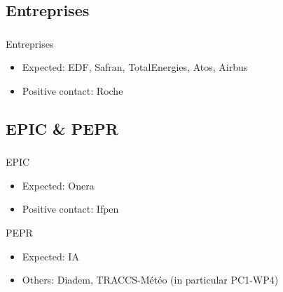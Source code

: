 \subsection{Entreprises}
\begin{frame}
  \frametitle{\insertsectionhead}
  \framesubtitle{\insertsubsectionhead}
  \begin{alertblock}{Entreprises}
    \begin{itemize}
      \item Expected: EDF, Safran, TotalEnergies, Atos, Airbus
      \item Positive contact: Roche
    \end{itemize}
  \end{alertblock}
\end{frame}

\subsection{EPIC \& PEPR}
\begin{frame}
  \frametitle{\insertsectionhead}
  \framesubtitle{\insertsubsectionhead}
\begin{alertblock}{EPIC}
  \begin{itemize}
    \item Expected: Onera
    \item Positive contact: Ifpen
  \end{itemize}
\end{alertblock}

\begin{alertblock}{PEPR}
  \begin{itemize}
    \item Expected: IA
    \item Others: Diadem, TRACCS-Météo (in particular PC1-WP4)
  \end{itemize}
\end{alertblock}

\end{frame}

